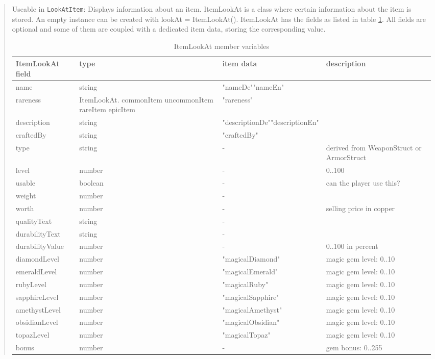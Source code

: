 \documentclass[a4paper,10pt,makeidx]{scrreprt}
\newcommand{\comm}[1]{\index{#1}\texttt{#1}}
\begin{document}
\begin{quote}
       Useable in \comm{LookAtItem}: Displays information about an item. ItemLookAt is a class where certain information about the item is stored. An empty instance can be created with lookAt = ItemLookAt(). ItemLookAt has the fields as listed in table \ref{ItemLookAt}. All fields are optional and some of them are coupled with a dedicated item data, storing the corresponding value.

\begin{table}
\begin{tabular}{l|p{3.8cm}|p{3cm}|p{3.5cm}}
    ItemLookAt field & type & item data & description\\ \hline
    name & string & "nameDe"\newline"nameEn"\\
    rareness & ItemLookAt.\newline
        \hspace*{5mm}commonItem\newline
        \hspace*{5mm}uncommonItem\newline
        \hspace*{5mm}rareItem\newline
        \hspace*{5mm}epicItem & "rareness"\\
    description & string & "descriptionDe"\newline"descriptionEn"\\
    craftedBy & string & "craftedBy"\\
    type & string & - & derived from WeaponStruct or ArmorStruct\\
    level & number & - & 0..100\\
    usable & boolean & - & can the player use this?\\
    weight & number & -\\
    worth & number & - & selling price in copper\\
    qualityText & string & -\\
    durabilityText & string & -\\
    durabilityValue & number & - & 0..100 in percent\\
    diamondLevel & number & "magicalDiamond" & magic gem level: 0..10\\
    emeraldLevel & number & "magicalEmerald" & magic gem level: 0..10\\
    rubyLevel & number & "magicalRuby" & magic gem level: 0..10\\
    sapphireLevel & number & "magicalSapphire" & magic gem level: 0..10\\
    amethystLevel & number & "magicalAmethyst" & magic gem level: 0..10\\
    obsidianLevel & number & "magicalObsidian" & magic gem level: 0..10\\
    topazLevel & number & "magicalTopaz" & magic gem level: 0..10\\
    bonus & number & - & gem bonus: 0..255\\
\end{tabular}
\caption{ItemLookAt member variables}\label{ItemLookAt}
\end{table}


\end{quote}
\end{document}
